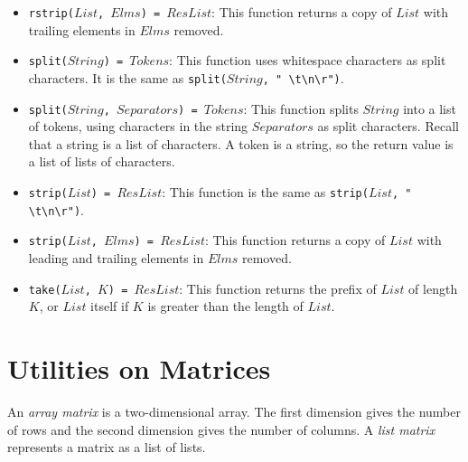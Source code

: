 \begin{itemize}
\item \texttt{rstrip($List$, $Elms$) = $ResList$}: This function returns a copy of $List$ with trailing elements in $Elms$ removed.
\item \texttt{split($String$) = $Tokens$}: This function uses whitespace characters as split characters.  It is the same as \texttt{split($String$, }\verb+" \t\n\r")+.
\item \texttt{split($String$, $Separators$) = $Tokens$}: This function splits $String$ into a list of tokens, using characters in the string $Separators$ as split characters. Recall that a string is a list of characters. A token is a string, so the return value is a list of lists of characters.
\item \texttt{strip($List$) = $ResList$}: This function is the same as \texttt{strip($List$, }\verb+" \t\n\r")+. 
\item \texttt{strip($List$, $Elms$) = $ResList$}: This function returns a copy of $List$ with leading and trailing elements in $Elms$ removed.
\item \texttt{take($List$, $K$) = $ResList$}: This function returns the prefix of $List$ of length $K$, or $List$ itself if $K$ is greater than the length of $List$.
\end{itemize}

\section{Utilities on Matrices}
An {\it array matrix} is a two-dimensional array. The first dimension gives the number of rows and the second dimension gives the number of columns. A {\it list matrix} represents a matrix as a list of lists.

